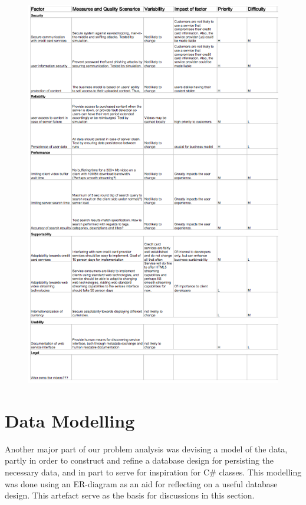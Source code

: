 \begin{figure}
\centerline{\includegraphics[width=6.5in]{FactorTable.png}}
\end{figure}

\section{Data Modelling}
Another major part of our problem analysis was devising a model of the data, partly in order to construct and refine a database design for persisting the necessary data, and in part to serve for inspiration for C\# classes.
This modelling was done using  an ER-diagram as an aid for reflecting on a useful database design. This artefact serve as the basis for discussions in this section.

